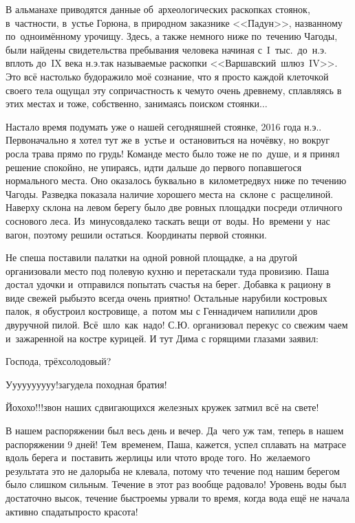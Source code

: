 В альманахе \cite{ЧагодаАльманахБашенькин} приводятся данные об~археологических раскопках стоянок, в~частности, в~устье Горюна, в природном заказнике <<Падун>>, названному по~одноимённому урочищу. Здесь, а также немного ниже по~течению Чагоды, были найдены свидетельства пребывания человека начиная с~I~тыс.~до~н.э. вплоть до~IX века н.э.\mdash так называемые раскопки <<Варшавский~шлюз~I\nbdash V>>. Это всё настолько будоражило моё сознание, что я просто каждой клеточкой своего тела ощущал эту сопричастность к чему\sdash то очень древнему, сплавляясь в этих местах и тоже, собственно, занимаясь поиском стоянки$\ldots$

Настало время подумать уже о нашей сегодняшней стоянке, 2016 года н.э.. Первоначально я хотел тут же в~устье и~остановиться на ночёвку, но вокруг росла трава прямо по грудь! Команде место было тоже не по~душе, и я принял решение спокойно, не упираясь, идти дальше до первого попавшегося нормального места. Оно оказалось буквально в~километре\sdash двух ниже по течению Чагоды. Разведка показала наличие хорошего места на~склоне с~расщелиной. Наверху склона на левом берегу было две ровных площадки посреди отличного соснового леса. Из~минусов\mdash далеко таскать вещи от~воды. Но~времени у~нас вагон, поэтому решили остаться. Координаты первой стоянки\mdash \CoordsChagodaSixteenFirst.

Не спеша поставили палатки на одной ровной площадке, а на другой организовали место под полевую кухню и перетаскали туда провизию. Паша достал удочки и~отправился попытать счастья на берег. Добавка к рациону в виде свежей рыбы\mdash это всегда очень приятно! Остальные нарубили костровых палок, я обустроил костровище, а~потом мы с Геннадичем напилили дров двуручной пилой. Всё~шло~как~надо! С.Ю. организовал перекус со свежим чаем и~зажаренной на костре курицей. И тут Дима с горящими глазами заявил:

\diagdash Господа, трёхсолодовый?

\diagdash У\sdash у\sdash у\sdash у\sdash у\sdash у\sdash у\sdash у\sdash у\sdash у!\mdash загудела походная братия!

\diagdash Йо\sdash хо\sdash хо!!!\mdash звон наших сдвигающихся железных кружек затмил всё на свете! 

В нашем распоряжении был весь день и вечер. Да~чего уж там, теперь в нашем распоряжении 9\thinspace\nbdash{} дней! Тем~временем, Паша, кажется, успел сплавать на~матрасе вдоль берега и~поставить жерлицы или что\sdash то вроде того. Но~желаемого результата это не дало\mdash рыба не клевала, потому что течение под нашим берегом было слишком сильным. Течение в этот раз вообще радовало! Уровень воды был достаточно высок, течение быстрое\mdash мы урвали то время, когда вода ещё не начала активно спадать\mdash просто кра\sdash со\sdash та!
 
